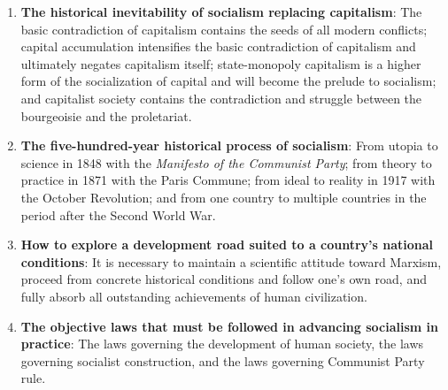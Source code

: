 \documentclass[12pt,a4paper]{ctexart}
\begin{document}
\begin{enumerate}[leftmargin=2em]
    \item \textbf{The historical inevitability of socialism replacing capitalism}: The basic contradiction of capitalism contains the seeds of all modern conflicts; capital accumulation intensifies the basic contradiction of capitalism and ultimately negates capitalism itself; state-monopoly capitalism is a higher form of the socialization of capital and will become the prelude to socialism; and capitalist society contains the contradiction and struggle between the bourgeoisie and the proletariat.
    
    \item \textbf{The five-hundred-year historical process of socialism}: From utopia to science in 1848 with the \textit{Manifesto of the Communist Party}; from theory to practice in 1871 with the Paris Commune; from ideal to reality in 1917 with the October Revolution; and from one country to multiple countries in the period after the Second World War.
    
    \item \textbf{How to explore a development road suited to a country's national conditions}: It is necessary to maintain a scientific attitude toward Marxism, proceed from concrete historical conditions and follow one's own road, and fully absorb all outstanding achievements of human civilization.
    
    \item \textbf{The objective laws that must be followed in advancing socialism in practice}: The laws governing the development of human society, the laws governing socialist construction, and the laws governing Communist Party rule.
\end{enumerate}
\end{document}
